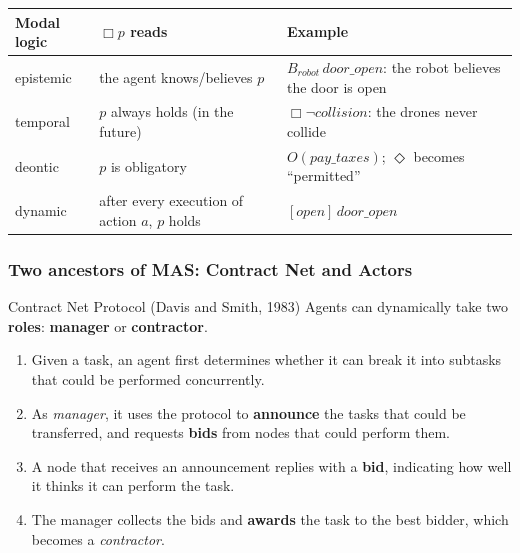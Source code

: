 \begin{center}
\small
\begin{tabularx}{\linewidth}{@{}l l >{\raggedright\arraybackslash}X@{}}
\toprule
\textbf{Modal logic} & \textbf{$\Box p$ reads} & \textbf{Example} \\
\midrule
epistemic & the agent knows/believes $p$ & $B_{\mathit{robot}}\,\mathit{door\_open}$: the robot believes the door is open \\
temporal & $p$ always holds (in the future) & $\Box\neg\mathit{collision}$: the drones never collide \\
deontic & $p$ is obligatory & $O(\mathit{pay\_taxes})$; $\Diamond$ becomes ``permitted'' \\
dynamic & after every execution of action $a$, $p$ holds & $[\mathit{open}]\,\mathit{door\_open}$ \\
\bottomrule
\end{tabularx}
\end{center}

\subsubsection{Two ancestors of MAS: Contract Net and Actors}

\begin{nbdef}{Contract Net Protocol (Davis and Smith, 1983)}
Agents can dynamically take two \textbf{roles}: \textbf{manager} or \textbf{contractor}.
\begin{enumerate}[nosep]
  \item Given a task, an agent first determines whether it can break it into subtasks that
        could be performed concurrently.
  \item As \emph{manager}, it uses the protocol to \textbf{announce} the tasks that could
        be transferred, and requests \textbf{bids} from nodes that could perform them.
  \item A node that receives an announcement replies with a \textbf{bid}, indicating how
        well it thinks it can perform the task.
  \item The manager collects the bids and \textbf{awards} the task to the best bidder,
        which becomes a \emph{contractor}.
\end{enumerate}
\end{nbdef}

